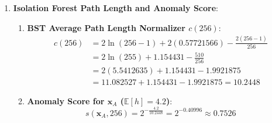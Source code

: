 \begin{enumerate}
\begin{enumerate}[label=(\alph*)]
        \item \textbf{Squared Mahalanobis Distance}:
        \begin{align*}
        \mathbf{\Sigma}^{-1} \mathbf{d} &= \begin{bmatrix} \frac{1}{3}(2.0) - \frac{25}{3}(0.04) \\ -\frac{25}{3}(2.0) + \frac{2500}{3}(0.04) \end{bmatrix} = \begin{bmatrix} \frac{2.0 - 1.0}{3} \\ \frac{-50.0 + 100.0}{3} \end{bmatrix} = \begin{bmatrix} \frac{1}{3} \\ \frac{50}{3} \end{bmatrix} \approx \begin{bmatrix} 0.3333 \\ 16.6667 \end{bmatrix} \\
        D_M^2(\mathbf{x}) &= \mathbf{d}^T (\mathbf{\Sigma}^{-1} \mathbf{d}) = 2.0\left(\frac{1}{3}\right) + 0.04\left(\frac{50}{3}\right) = \frac{2.0}{3} + \frac{2.0}{3} = \frac{4.0}{3} \approx \mathbf{1.3333}
        \end{align*}
        $D_M(\mathbf{x}) = \sqrt{1.3333} \approx 1.1547$.

        \item \textbf{Anomaly Decision}:
        Because $D_M^2(\mathbf{x}) = 1.3333 < \chi^2_{2, 0.95} = 5.991$, the observation falls safely within the $95\%$ confidence ellipse. The point is classified as \textbf{Normal}.
    \end{enumerate}

    \item \textbf{Isolation Forest Path Length and Anomaly Score}:
    \begin{enumerate}[label=(\alph*)]
        \item \textbf{BST Average Path Length Normalizer $c(256)$}:
        \begin{align*}
        c(256) &= 2 \ln(256 - 1) + 2(0.57721566) - \frac{2(256 - 1)}{256} \\
        &= 2 \ln(255) + 1.154431 - \frac{510}{256} \\
        &= 2(5.5412635) + 1.154431 - 1.9921875 \\
        &= 11.082527 + 1.154431 - 1.9921875 = \mathbf{10.2448}
        \end{align*}

        \item \textbf{Anomaly Score for $\mathbf{x}_A$ ($\mathbb{E}[h] = 4.2$)}:
        \begin{equation*}
        s(\mathbf{x}_A, 256) = 2^{-\frac{4.2}{10.2448}} = 2^{-0.40996} \approx \mathbf{0.7526}
        \end{equation*}


\end{enumerate}
\end{enumerate}
